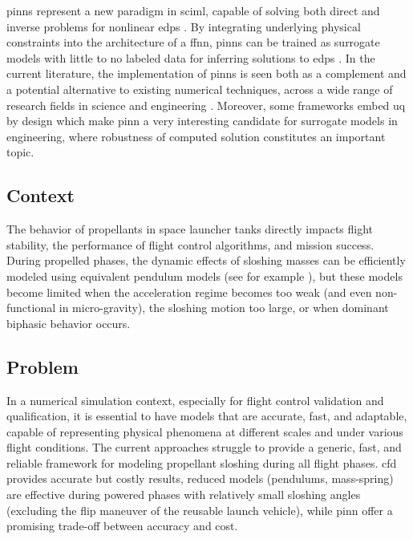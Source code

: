\documentclass[12pt]{article}
\begin{document}
	\glspl{pinn} represent a new paradigm in \gls{sciml}, capable of solving both direct and inverse problems for nonlinear \glspl{edp} \cite{raissiPhysicsinformedNeuralNetworks2019}. By integrating underlying physical constraints into the architecture of a \gls{ffnn}, \glspl{pinn} can be trained as surrogate models with little to no labeled data for inferring solutions to \glspl{edp} \cite{cuomoScientificMachineLearning2022}.
	In the current literature, the implementation of \glspl{pinn} is seen both as a complement and a potential alternative to existing numerical techniques, across a wide range of research fields in science and engineering \cite{maoPhysicsinformedNeuralNetworks2020, buosoPersonalisingLeftventricularBiophysical2021, caiPhysicsInformedNeuralNetworks2021}.
	Moreover, some frameworks embed \gls{uq} by design \cite{yangBPINNsBayesianPhysicsInformed2021,zhangQuantifyingTotalUncertainty2018} which make \acrshort{pinn} a very interesting candidate for surrogate models in engineering, where robustness of computed solution constitutes an important topic.
	
	\subsection*{Context}
	
	The behavior of propellants in space launcher tanks directly impacts flight stability, the performance of flight control algorithms, and mission success. During propelled phases, the dynamic effects of sloshing masses can be efficiently modeled using equivalent pendulum models (see for example \cite{ibrahimLiquidSloshingDynamics2005a}), but these models become limited when the acceleration regime becomes too weak (and even non-functional in micro-gravity), the sloshing motion too large, or when dominant biphasic behavior occurs.
	
	\subsection*{Problem}
	
	In a numerical simulation context, especially for flight control validation and qualification, it is essential to have models that are accurate, fast, and adaptable, capable of representing physical phenomena at different scales and under various flight conditions.
	The current approaches struggle to provide a generic, fast, and reliable framework for modeling propellant sloshing during all flight phases. \acrshort{cfd} provides accurate but costly results, reduced models (pendulums, mass-spring) are effective during powered phases with relatively small sloshing angles (excluding the flip maneuver of the reusable launch vehicle), while \acrshort{pinn} offer a promising trade-off between accuracy and cost.
	
\end{document}

